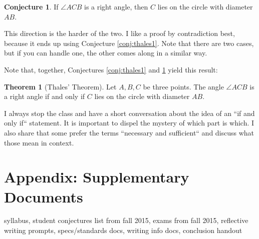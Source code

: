 \documentclass{tufte-handout}
\theoremstyle{definition}
\newtheorem{conjecture}[problem]{Conjecture}
\newtheorem*{theorem}{Theorem}
\begin{document}
\begin{conjecture}
\label{conj:thales2}
If $\angle ACB$ is a right angle, then $C$ lies on the circle with diameter $AB$.
\end{conjecture}

This direction is the harder of the two. I like a proof by contradiction best, because it ends up using Conjecture \ref{conj:thales1}. Note that there are two cases, but if you can handle one, the other comes along in a similar way.

Note that, together, Conjectures \ref{conj:thales1} and \ref{conj:thales2} yield this result:
\begin{theorem}[Thales' Theorem] 
Let $A, B, C$ be three points. 
The angle $\angle ACB$ is a right angle if and only if $C$ lies on the circle with diameter $AB$.
\end{theorem}

I always stop the class and have a short conversation about 
the idea of an ``if and only if`` statement. It is important to dispel the mystery of which part is which. I also share 
that some prefer the terms ``necessary and sufficient`` and discuss what those mean in context.









\clearpage
\section{Appendix: Supplementary Documents}

syllabus, student conjectures list from fall 2015, exams from fall 2015, reflective writing prompts, specs/standards docs, writing info docs, conclusion handout
\end{document}
